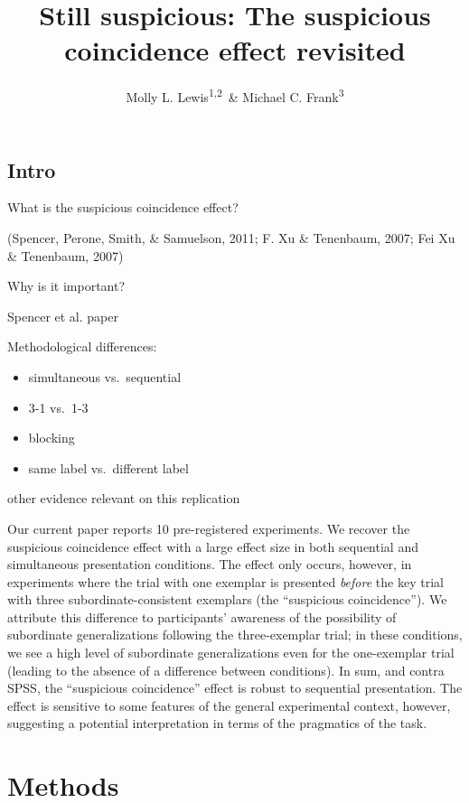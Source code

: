 \documentclass[english,floatsintext,man]{apa6}
\title{Still suspicious: The suspicious coincidence effect revisited}
\author{Molly L. Lewis\textsuperscript{1,2}~\& Michael C. Frank\textsuperscript{3}}
\affiliation{
    \vspace{0.5cm}
          \textsuperscript{1} Computation Institute, University of Chicago\\
          \textsuperscript{2} Department of Psychology, University of Wisconsin, Madison\\
          \textsuperscript{3} Department of Psychology, Stanford University  }
\providecommand{\tightlist}{%
  \setlength{\itemsep}{0pt}\setlength{\parskip}{0pt}}
\theoremstyle{definition}
\theoremstyle{definition}
\theoremstyle{remark}
\begin{document}
\maketitle

\setcounter{secnumdepth}{0}



\subsection{Intro}\label{intro}

What is the suspicious coincidence effect?

(Spencer, Perone, Smith, \& Samuelson, 2011; F. Xu \& Tenenbaum, 2007;
Fei Xu \& Tenenbaum, 2007)

Why is it important?

Spencer et al. paper

Methodological differences:

\begin{itemize}
\tightlist
\item
  simultaneous vs.~sequential
\item
  3-1 vs.~1-3
\item
  blocking
\item
  same label vs.~different label
\end{itemize}

other evidence relevant on this replication

Our current paper reports 10 pre-registered experiments. We recover the
suspicious coincidence effect with a large effect size in both
sequential and simultaneous presentation conditions. The effect only
occurs, however, in experiments where the trial with one exemplar is
presented \emph{before} the key trial with three subordinate-consistent
exemplars (the \enquote{suspicious coincidence}). We attribute this
difference to participants' awareness of the possibility of subordinate
generalizations following the three-exemplar trial; in these conditions,
we see a high level of subordinate generalizations even for the
one-exemplar trial (leading to the absence of a difference between
conditions). In sum, and contra SPSS, the \enquote{suspicious
coincidence} effect is robust to sequential presentation. The effect is
sensitive to some features of the general experimental context, however,
suggesting a potential interpretation in terms of the pragmatics of the
task.

\section{Methods}\label{methods}
\end{document}
